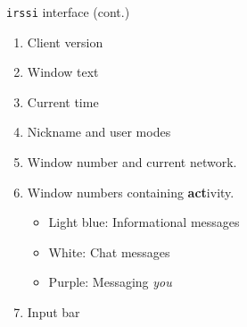 \documentclass{beamer}
\begin{document}
\begin{frame}{\texttt{irssi} interface (cont.)}
\begin{enumerate}
	\item Client version
	\item Window text
	\item Current time
	\item Nickname and user modes
	\item Window number and current network.
	\item Window numbers containing \textbf{act}ivity.
	\begin{itemize}
		\item Light blue: Informational messages
		\item White: Chat messages
		\item Purple: Messaging \emph{you}
	\end{itemize}
	\item Input bar
\end{enumerate}
\end{frame}
\end{document}
